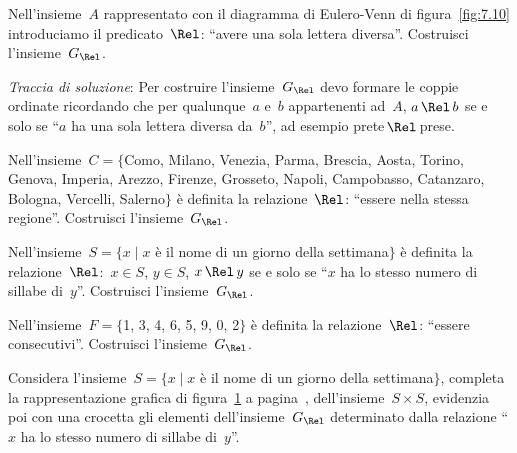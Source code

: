 \begin{esercizio}
\label{ese:\thechapter.3}
Nell'insieme~$A$ rappresentato con il diagramma di Eulero-Venn di figura~\ref{fig:7.10} introduciamo il predicato~$\Rel$: ``avere
una sola lettera diversa''. Costruisci l'insieme~$G_\Rel$.

\begin{figure}[b]
\begin{minipage}[b]{.45\textwidth}
 \centering
 
 \caption{}\label{fig:7.10}
\end{minipage}\hfil
\begin{minipage}[b]{.45\textwidth}
 \centering
 
 \caption{}\label{fig:7.11}
\end{minipage}
\end{figure}

\emph{Traccia di soluzione}:
Per costruire l'insieme~$G_\Rel$ devo formare le coppie ordinate ricordando che per qualunque~$a$ e~$b$ appartenenti ad~$A$, $a \,\Rel\, b$
se e solo se ``$a$ ha una sola lettera diversa da~$b$'', ad esempio prete$\,\Rel\,$prese.
\end{esercizio}

\begin{esercizio}
\label{ese:\thechapter.4}
Nell'insieme~$C = \{$Como, Milano, Venezia, Parma, Brescia, Aosta, Torino, Genova, Imperia, Arezzo,
Firenze, Grosseto, Napoli, Campobasso, Catanzaro, Bologna, Vercelli, Salerno$\}$ è definita la
relazione~$\Rel$: ``essere nella stessa regione''. Costruisci l'insieme~$G_\Rel$.
\end{esercizio}

\begin{esercizio}
\label{ese:\thechapter.5}
Nell'insieme~$S = \{ x \mid  x$ è il nome di un giorno della settimana$\}$ è definita la
relazione~$\Rel$:~$x \in S$, $y \in S$, $x \,\Rel\, y$ se e solo se ``$x$ ha
lo stesso numero di sillabe di~$y$''. Costruisci l'insieme~$G_\Rel$.
\end{esercizio}

\begin{esercizio}
\label{ese:\thechapter.6}
Nell'insieme~$F = \{$1, 3, 4, 6, 5, 9, 0, 2$\}$ è definita la relazione~$\Rel$: ``essere consecutivi''. Costruisci l'insieme~$G_\Rel$.
\end{esercizio}

 \begin{esercizio}
\label{ese:\thechapter.7}
Considera l'insieme~$S = \{ x \mid  x$ è il nome di un giorno della settimana$\}$, completa la rappresentazione grafica di figura~\ref{fig:7.11} a pagina~\pageref{fig:7.11}, dell'insieme~$S \times S$,
evidenzia poi con una crocetta gli elementi dell'insieme~$G_\Rel$ determinato dalla relazione ``$x$ ha lo stesso numero di sillabe di~$y$''.
\end{esercizio}

